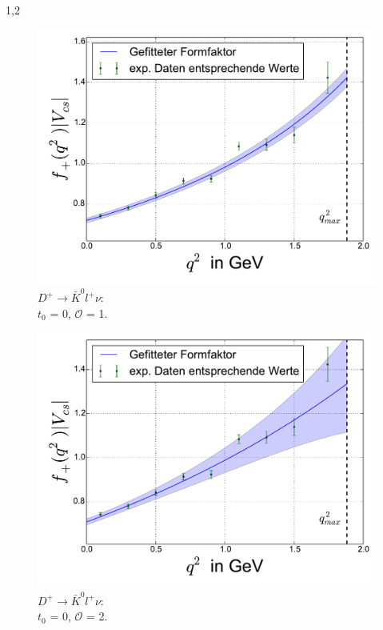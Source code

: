 \documentclass[11pt,a4paper,twoside]{report}
\begin{document}
\begin{spacing}{1,2}
 \begin{minipage}[H]{0.45\textwidth}
 \begin{figure}[H]
 \includegraphics[width=1\textwidth]{Fit/D+-1Ord-0.pdf}
 \caption{$D^+\rightarrow \bar K^0 l^+ \nu$: \\$t_0$ = 0, $\mathcal{O}$ = 1.}
 \label{pic_D+-1Ord-0}
 \end{figure}
 \end{minipage}
 \hfill
 \begin{minipage}[H]{0.45\textwidth}
 \begin{figure}[H]
 \includegraphics[width=1\textwidth]{Fit/D+-2Ord-0.pdf}
 \caption{$D^+\rightarrow \bar K^0 l^+ \nu$: \\$t_0$ = 0, $\mathcal{O}$ = 2.}
 \label{pic_D+-2Ord-0}
 \end{figure}
 \end{minipage}
 

\end{spacing}
\end{document}
